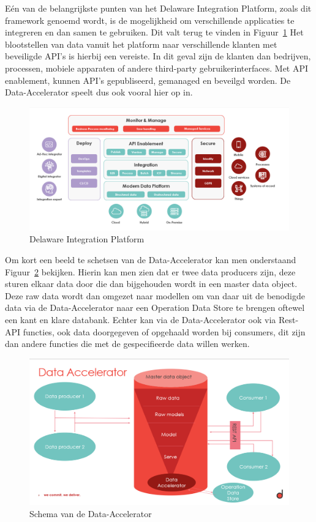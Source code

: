 Eén van de belangrijkste punten van het Delaware Integration Platform, zoals dit framework genoemd wordt, is de mogelijkheid om verschillende applicaties te integreren en dan samen te gebruiken. Dit valt terug te vinden in Figuur~\ref{fig:DIP} Het blootstellen van data vanuit het platform naar verschillende klanten met beveiligde API's is hierbij een vereiste. In dit geval zijn de klanten dan bedrijven, processen, mobiele apparaten of andere third-party gebruikerinterfaces. Met API enablement, kunnen API's gepubliseerd, gemanaged en beveilgd worden. De Data-Accelerator speelt dus ook vooral hier op in.

\begin{figure}
    \centering
    \includegraphics[scale=0.60]{../img/DIP.png}
    \caption{\label{fig:DIP}Delaware Integration Platform}
\end{figure}

Om kort een beeld te schetsen van de Data-Accelerator kan men onderstaand Figuur~\ref{fig:DataAccelerator} bekijken. Hierin kan men zien dat er twee data producers zijn, deze sturen elkaar data door die dan bijgehouden wordt in een master data object. Deze raw data wordt dan omgezet naar modellen om van daar uit de benodigde data via de Data-Accelerator naar een Operation Data Store te brengen oftewel een kant en klare databank. Echter kan via de Data-Accelerator ook via Rest-API functies, ook data doorgegeven of opgehaald worden bij consumers, dit zijn dan andere functies die met de gespecifieerde data willen werken.

\begin{figure}
    \centering
    \includegraphics[scale=0.60]{../img/DataAccelerator.png}
    \caption{\label{fig:DataAccelerator}Schema van de Data-Accelerator}
\end{figure}
